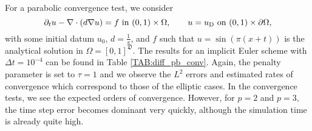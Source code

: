 \documentclass[a4paper, english, 12pt, reqno, draft]{amsart}
\theoremstyle{definition}
\theoremstyle{remark}
\numberwithin{equation}{section}
\newcommand{\globDim}{\ensuremath{\mathfrak D}}
\begin{document}
% 
For a parabolic convergence test, we consider
% 
\begin{equation}
 \partial_t u - \nabla \cdot (d \nabla u) = f \text{ in } (0,1) \times \Omega, \qquad u = u_\text D \text{ on } (0,1) \times \partial \Omega,
\end{equation}
% 
with some initial datum $u_0$, $d = \tfrac{1}{\pi}$, and $f$ such that $u = \sin(\pi(x + t))$ is the analytical solution in $\Omega = [0,1]^\globDim$. The results for an implicit Euler scheme with $\Delta t = 10^{-4}$ can be found in Table \ref{TAB:diff_pb_conv}. Again, the penalty parameter is set to $\tau = 1$ and we observe the $L^2$ errors and estimated rates of convergence which correspond to those of the elliptic cases. In the convergence tests, we see the expected orders of convergence. However, for $p=2$ and $p=3$, the time step  error becomes dominant very quickly, although the simulation time is already quite high.
% 
\end{document}
